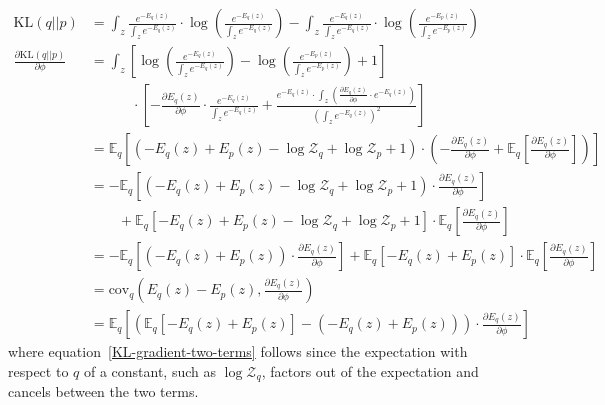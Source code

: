 \documentclass{article} %
\def\KL{\text{KL}}
\def\cov{\text{cov}}
\begin{document}
\begin{align}
\KL(q || p) &= \int_z \frac{e^{-E_q(z)}}{\int_z e^{-E_q(z)}} \cdot \log \left( \frac{e^{-E_q(z)}}{\int_z e^{-E_q(z)}} \right) - 
\int_z \frac{e^{-E_q(z)}}{\int_z e^{-E_q(z)}} \cdot \log \left( \frac{e^{-E_p(z)}}{\int_z e^{-E_p(z)}} \right) \nonumber \\
\frac{\partial \KL(q || p)}{\partial \phi} &= \int_z \left[ \log \left( \frac{e^{-E_q(z)}}{\int_z e^{-E_q(z)}} \right) 
- \log \left( \frac{e^{-E_p(z)}}{\int_z e^{-E_p(z)}} \right) + 1 \right] \nonumber \\
&\quad\qquad \cdot \left[ -\frac{\partial E_q(z)}{\partial \phi} \cdot \frac{e^{-E_q(z)}}{\int_z e^{-E_q(z)}} 
+ \frac{e^{-E_q(z)} \cdot \int_z \left( \frac{\partial E_q(z)}{\partial \phi} \cdot e^{-E_q(z)} \right)}{\left( \int_z e^{-E_q(z)} \right)^2} 
\right] \nonumber \\
&= \mathbb{E}_q \left[ \left(-E_q(z) + E_p(z) - \log \mathcal{Z}_q + \log \mathcal{Z}_p + 1 \right) \cdot 
\left( -\frac{\partial E_q(z)}{\partial \phi} + \mathbb{E}_q \left[ \frac{ \partial E_q(z)}{\partial \phi} \right] \right) \right] \nonumber \\
&= -\mathbb{E}_q \left[ \left(-E_q(z) + E_p(z) - \log \mathcal{Z}_q + \log \mathcal{Z}_p + 1 \right) \cdot \frac{\partial E_q(z)}{\partial \phi} \right] \nonumber \\
&\qquad + \mathbb{E}_q \left[ -E_q(z) + E_p(z) - \log \mathcal{Z}_q + \log \mathcal{Z}_p + 1 \right] 
\cdot \mathbb{E}_q \left[ \frac{\partial E_q(z)}{\partial \phi} \right] \nonumber \\
&= -\mathbb{E}_q \left[ \left(-E_q(z) + E_p(z) \right) \cdot \frac{\partial E_q(z)}{\partial \phi} \right]
+ \mathbb{E}_q \left[ -E_q(z) + E_p(z) \right] \cdot \mathbb{E}_q \left[ \frac{\partial E_q(z)}{\partial \phi} \right] \label{KL-gradient-two-terms}\\
&= \cov_q \left( E_q(z) - E_p(z), \frac{\partial E_q(z)}{\partial \phi} \right) \label{KL-gradient-cov} \\
&= \mathbb{E}_q \left[ \left( \mathbb{E}_q\left[-E_q(z) + E_p(z)\right] - \left(-E_q(z) + E_p(z) \right)\right) \cdot \frac{\partial E_q(z)}{\partial \phi} \right] \label{KL-gradient-one-term}
\end{align}
where equation~\ref{KL-gradient-two-terms} follows since the expectation with respect to $q$ of a constant, such as $\log \mathcal{Z}_q$, factors out of the expectation and cancels between the two terms.
\end{document}

